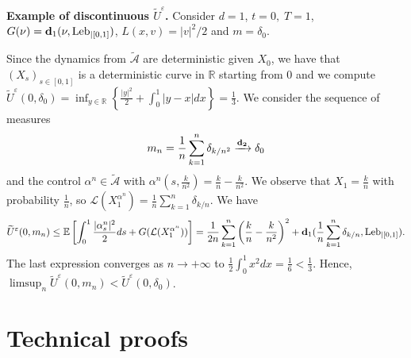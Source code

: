 \documentclass[reqno,11pt]{amsart}
\numberwithin{equation}{section}
\newcommand{\R}{\mathbb{R}} %
\newcommand{\e}{\varepsilon}
\newcommand{\nd}{\noindent}
\begin{document}
    \nd\textbf{Example of discontinuous $\widetilde{U}^\e$.} Consider $d=1$, $t=0,\; T=1$, $G(\nu)={\bf d}_1(\nu,\text{Leb}_{|[0,1]})$, $L(x,v)=|v|^2/2$ and $m=\delta_0$.
    \vspace{1mm}

    \nd
    Since the dynamics from $\widetilde{\mathcal{A}}$ are deterministic given $X_0$, we have that $(X_s)_{s\in [0,1]}$ is a deterministic curve in $\R$ starting from $0$ and we compute
    $\widetilde{U}^\e(0,\delta_0)=\inf_{y\in \R}\left\{\frac{|y|^2}{2} +\int_0^1|y-x|dx  \right\}=\frac{1}{3}.$
    We consider the sequence of measures
    $$m_n=\frac{1}{n}\sum_{k=1}^n\delta_{k/n^2}\xrightarrow{{\bf d_2}}\delta_0$$
    and the control $\alpha^n\in\widetilde{\mathcal{A}}$ with $\alpha^n(s,\frac{k}{n^2})=\frac{k}{n}-\frac{k}{n^2}$. We observe that $X_1=\frac{k}{n}$ with probability $\frac{1}{n}$, so $\mathcal{L}(X_1^{\alpha^n})=\frac{1}{n}\sum_{k=1}^n\delta_{k/n}$. We have
    \begin{align*}
    \widetilde{U}^\e(0,m_n)\le \mathbb{E}\left[ \int_0^1\frac{|\alpha^n_s|^2}{2}ds +G(\mathcal{L}(X_1^{\alpha^n}))\right]=\frac{1}{2n}\sum_{k=1}^n\left(\frac{k}{n}-\frac{k}{n^2}\right)^2+{\bf d}_1(\frac{1}{n}\sum_{k=1}^n\delta_{k/n},\text{Leb}_{|[0,1]}).
    \end{align*}
    The last expression converges as $n\to +\infty$ to $\frac{1}{2}\int_0^1x^2dx=\frac{1}{6}<\frac{1}{3}$. Hence, $\limsup_n \widetilde{U}^\e(0,m_n)<\widetilde{U}^\e(0,\delta_0)$.


\section{Technical proofs}\label{tech}
\end{document}

